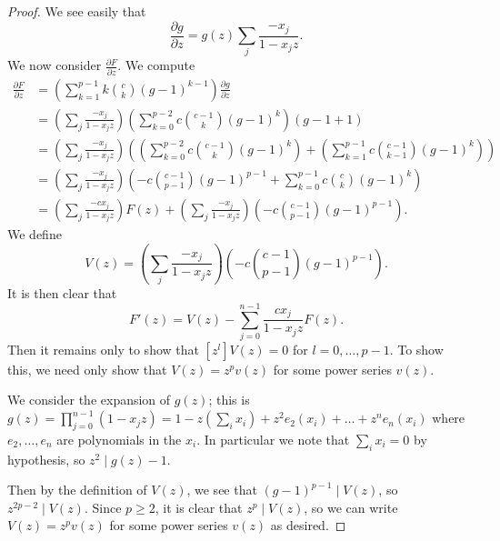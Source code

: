 \documentclass{amsart}
\numberwithin{equation}{section}
\theoremstyle{definition}
\begin{document}
\begin{proof}
We see easily that 
\[
\frac{\partial g}{\partial z} = g(z) \sum_j \frac{-x_j}{1-x_jz}.
\]
We now consider $\frac{\partial F}{\partial z}$. We compute
\begin{align*}
\frac{\partial F}{\partial z}%
&=\left(\sum_{k=1}^{p-1}k\binom{c}{k}(g-1)^{k-1}\right)\frac{\partial g}{\partial z}\\
&=\left(\sum_j \frac{-x_j}{1-x_jz}\right)\left(\sum_{k=0}^{p-2}c\binom{c-1}{k}(g-1)^{k}\right)(g-1+1)\\
&=\left(\sum_j \frac{-x_j}{1-x_jz}\right)\left(\left(\sum_{k=0}^{p-2}c\binom{c-1}{k}(g-1)^{k}\right)+\left(\sum_{k=1}^{p-1}c\binom{c-1}{k-1}(g-1)^{k}\right)\right)\\
&=\left(\sum_j \frac{-x_j}{1-x_jz}\right)\left(-c\binom{c-1}{p-1}(g-1)^{p-1}+\sum_{k=0}^{p-1}c\binom{c}{k}(g-1)^{k}\right)\\
&=\left(\sum_j \frac{-cx_j}{1-x_jz}\right)F(z)+\left(\sum_j \frac{-x_j}{1-x_jz}\right)\left(-c\binom{c-1}{p-1}(g-1)^{p-1}\right).
\end{align*}
We define 
\[
V(z)=\left(\sum_j \frac{-x_j}{1-x_jz}\right)\left(-c\binom{c-1}{p-1}(g-1)^{p-1}\right).
\]
It is then clear that 
\[
F'(z) = V(z) - \sum_{j=0}^{n-1} \frac{cx_j}{1-x_jz} F(z).
\]
Then it remains only to show that $[z^l]V(z)=0$ for $l=0,\dots,p-1$. To show this, we need only show that $V(z)=z^pv(z)$ for some power series $v(z)$. 

We consider the expansion of $g(z)$; this is $g(z)=\prod_{j=0}^{n-1} (1-x_jz) = 1-z\left(\sum_i x_i\right)+z^2e_2(x_i)+\dots+z^ne_n(x_i)$ where $e_2,\dots,e_n$ are polynomials in the $x_i$. In particular we note that $\sum_i x_i=0$ by hypothesis, so $z^2 \mid g(z)-1$. 

Then by the definition of $V(z)$, we see that $(g-1)^{p-1} \mid V(z)$, so $z^{2p-2} \mid V(z)$. Since $p \ge 2$, it is clear that $z^p \mid V(z)$, so we can write $V(z)=z^pv(z)$ for some power series $v(z)$ as desired. 
\end{proof}
\end{document}
